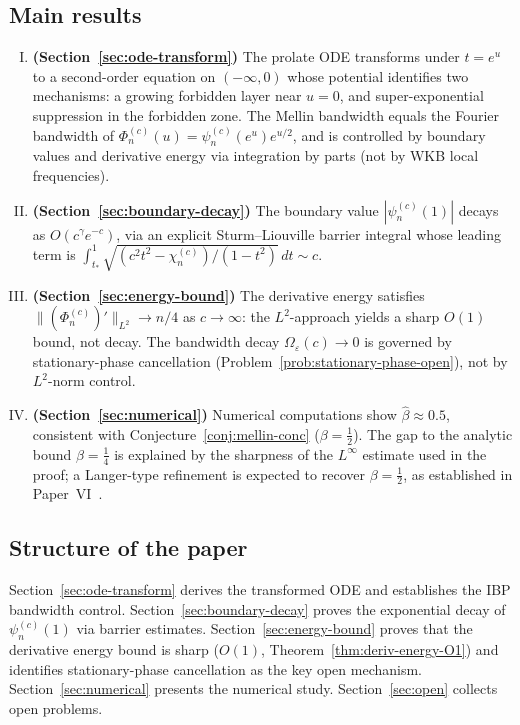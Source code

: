 \documentclass[12pt,a4paper]{amsart}
\theoremstyle{remark}
\begin{document}
\subsection*{Main results}

\begin{enumerate}[(I)]
\item \textbf{(Section~\ref{sec:ode-transform})}
The prolate ODE transforms under $t = e^u$ to a second-order
equation on $(-\infty,0)$ whose potential identifies two mechanisms:
a growing forbidden layer near $u=0$, and super-exponential
suppression in the forbidden zone.
The Mellin bandwidth equals the Fourier bandwidth of
$\Phi_n^{(c)}(u) = \psi_n^{(c)}(e^u)e^{u/2}$,
and is controlled by boundary values and derivative energy
via integration by parts (not by WKB local frequencies).

\item \textbf{(Section~\ref{sec:boundary-decay})}
The boundary value $|\psi_n^{(c)}(1)|$ decays as $O(c^\gamma e^{-c})$,
via an explicit Sturm--Liouville barrier integral whose leading
term is $\int_{t_*}^1\sqrt{(c^2t^2-\chi_n^{(c)})/(1-t^2)}\,dt \sim c$.

\item \textbf{(Section~\ref{sec:energy-bound})}
The derivative energy satisfies
$\|(\Phi_n^{(c)})'\|_{L^2} \to n/4$ as $c\to\infty$:
the $L^2$-approach yields a sharp $O(1)$ bound, not decay.
The bandwidth decay $\Omega_\varepsilon(c) \to 0$ is governed
by stationary-phase cancellation
(Problem~\ref{prob:stationary-phase-open}), not by
$L^2$-norm control.

\item \textbf{(Section~\ref{sec:numerical})}
Numerical computations show $\hat\beta \approx 0.5$,
consistent with Conjecture~\ref{conj:mellin-conc}
($\beta = \tfrac{1}{2}$).
The gap to the analytic bound $\beta = \tfrac{1}{4}$ is explained
by the sharpness of the $L^\infty$ estimate used in the proof;
a Langer-type refinement is expected to recover $\beta = \tfrac{1}{2}$,
as established in Paper~VI~\cite{PaperVI}.
\end{enumerate}

\subsection*{Structure of the paper}

Section~\ref{sec:ode-transform} derives the transformed ODE and
establishes the IBP bandwidth control.
Section~\ref{sec:boundary-decay} proves the exponential decay of
$\psi_n^{(c)}(1)$ via barrier estimates.
Section~\ref{sec:energy-bound} proves that the derivative energy
bound is sharp ($O(1)$, Theorem~\ref{thm:deriv-energy-O1}) and identifies
stationary-phase cancellation as the key open mechanism.
Section~\ref{sec:numerical} presents the numerical study.
Section~\ref{sec:open} collects open problems.
\end{document}
